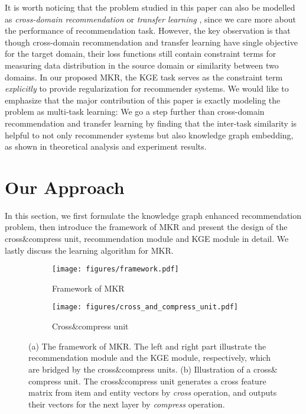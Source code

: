 \documentclass[sigconf]{acmart}
\begin{document}
	It is worth noticing that the problem studied in this paper can also be modelled as \textit{cross-domain recommendation} \cite{tang2012cross} or \textit{transfer learning} \cite{pan2010survey}, since we care more about the performance of recommendation task.
	However, the key observation is that though cross-domain recommendation and transfer learning have single objective for the target domain, their loss functions still contain constraint terms for measuring data distribution in the source domain or similarity between two domains.
	In our proposed MKR, the KGE task serves as the constraint term \textit{explicitly} to provide regularization for recommender systems.
	We would like to emphasize that the major contribution of this paper is exactly modeling the problem as multi-task learning: We go a step further than cross-domain recommendation and transfer learning by finding that the inter-task similarity is helpful to not only recommender systems but also knowledge graph embedding, as shown in theoretical analysis and experiment results.
	
	

\section{Our Approach}
	In this section, we first formulate the knowledge graph enhanced recommendation problem, then introduce the framework of MKR and present the design of the cross$\&$compress unit, recommendation module and KGE module in detail.
	We lastly discuss the learning algorithm for MKR.
	
	\begin{figure*}[t]
		\centering
        \begin{subfigure}[b]{0.5\textwidth}
            \texttt{[image: figures/framework.pdf]}
            \caption{Framework of MKR}
            \label{fig:framework}
        \end{subfigure}
        \hspace{0.06\textwidth}
        \begin{subfigure}[b]{0.36\textwidth}
            \texttt{[image: figures/cross\_and\_compress\_unit.pdf]}
            \caption{Cross$\&$compress unit}
            \label{fig:cross_feature_sharing_unit}
        \end{subfigure}
        \caption{(a) The framework of MKR. The left and right part illustrate the recommendation module and the KGE module, respectively, which are bridged by the cross$\&$compress units. (b) Illustration of a cross$\&$compress unit. The cross$\&$compress unit generates a cross feature matrix from item and entity vectors by \textit{cross} operation, and outputs their vectors for the next layer by \textit{compress} operation.}
        \label{fig:1}
    \end{figure*}
    
\end{document}
